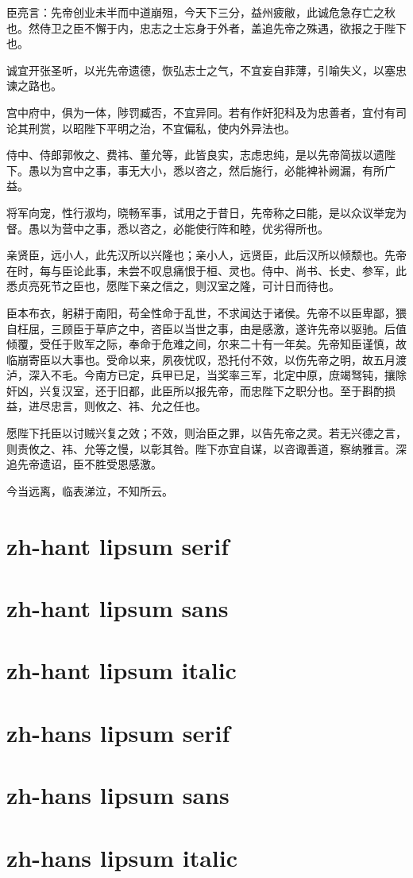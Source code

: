 \documentclass[a4paper,12pt, fontset=none, hyperref]{ctexbook}
\begin{document}
		臣亮言：先帝创业未半而中道崩殂，今天下三分，益州疲敝，此诚危急存亡之秋也。然侍卫之臣不懈于内，忠志之士忘身于外者，盖追先帝之殊遇，欲报之于陛下也。
		
		诚宜开张圣听，以光先帝遗德，恢弘志士之气，不宜妄自菲薄，引喻失义，以塞忠谏之路也。
		
		宫中府中，俱为一体，陟罚臧否，不宜异同。若有作奸犯科及为忠善者，宜付有司论其刑赏，以昭陛下平明之治，不宜偏私，使内外异法也。
		
		侍中、侍郎郭攸之、费祎、董允等，此皆良实，志虑忠纯，是以先帝简拔以遗陛下。愚以为宫中之事，事无大小，悉以咨之，然后施行，必能裨补阙漏，有所广益。
		
		将军向宠，性行淑均，晓畅军事，试用之于昔日，先帝称之曰能，是以众议举宠为督。愚以为营中之事，悉以咨之，必能使行阵和睦，优劣得所也。
		
		亲贤臣，远小人，此先汉所以兴隆也；亲小人，远贤臣，此后汉所以倾颓也。先帝在时，每与臣论此事，未尝不叹息痛恨于桓、灵也。侍中、尚书、长史、参军，此悉贞亮死节之臣也，愿陛下亲之信之，则汉室之隆，可计日而待也。
		
		臣本布衣，躬耕于南阳，苟全性命于乱世，不求闻达于诸侯。先帝不以臣卑鄙，猥自枉屈，三顾臣于草庐之中，咨臣以当世之事，由是感激，遂许先帝以驱驰。后值倾覆，受任于败军之际，奉命于危难之间，尔来二十有一年矣。先帝知臣谨慎，故临崩寄臣以大事也。受命以来，夙夜忧叹，恐托付不效，以伤先帝之明，故五月渡泸，深入不毛。今南方已定，兵甲已足，当奖率三军，北定中原，庶竭驽钝，攘除奸凶，兴复汉室，还于旧都，此臣所以报先帝，而忠陛下之职分也。至于斟酌损益，进尽忠言，则攸之、祎、允之任也。
		
		愿陛下托臣以讨贼兴复之效；不效，则治臣之罪，以告先帝之灵。若无兴德之言，则责攸之、祎、允等之慢，以彰其咎。陛下亦宜自谋，以咨诹善道，察纳雅言。深追先帝遗诏，臣不胜受恩感激。
		
		今当远离，临表涕泣，不知所云。

	\chapter{zh-hant lipsum serif}

		\zhlipsum[1-20][name=trad]

	\chapter{zh-hant lipsum sans}

		\textbf{\zhlipsum[1-20][name=xiangyu]}
		
	\chapter{zh-hant lipsum italic}
	
		\textit{\zhlipsum[1-20][name=zhufu]}

	\chapter{zh-hans lipsum serif}

		\zhlipsum[1-20]
		
	\chapter{zh-hans lipsum sans}

		\textbf{\zhlipsum[1-20]}

	\chapter{zh-hans lipsum italic}

		\textit{\zhlipsum[1-20]}
\end{document}
